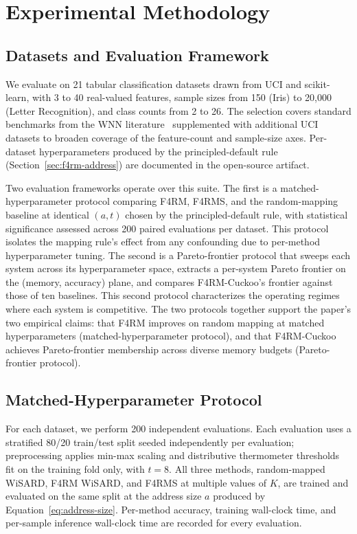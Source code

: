 

\section{Experimental Methodology}
\label{sec:methodology}
\label{sec:experiments}

\subsection{Datasets and Evaluation Framework}
\label{sec:method-data}

We evaluate on 21 tabular classification datasets drawn from UCI and scikit-learn, with 3 to 40 real-valued features, sample sizes from 150 (Iris) to 20{,}000 (Letter Recognition), and class counts from 2 to 26. The selection covers standard benchmarks from the WNN literature~\cite{susskind2022bthowen,susskind2023uleen} supplemented with additional UCI datasets to broaden coverage of the feature-count and sample-size axes. Per-dataset hyperparameters produced by the principled-default rule (Section~\ref{sec:f4rm-address}) are documented in the open-source artifact.

Two evaluation frameworks operate over this suite. The first is a matched-hyperparameter protocol comparing F4RM, F4RMS, and the random-mapping baseline at identical $(a, t)$ chosen by the principled-default rule, with statistical significance assessed across 200 paired evaluations per dataset. This protocol isolates the mapping rule's effect from any confounding due to per-method hyperparameter tuning. The second is a Pareto-frontier protocol that sweeps each system across its hyperparameter space, extracts a per-system Pareto frontier on the (memory, accuracy) plane, and compares F4RM-Cuckoo's frontier against those of ten baselines. This second protocol characterizes the operating regimes where each system is competitive. The two protocols together support the paper's two empirical claims: that F4RM improves on random mapping at matched hyperparameters (matched-hyperparameter protocol), and that F4RM-Cuckoo achieves Pareto-frontier membership across diverse memory budgets (Pareto-frontier protocol).

\subsection{Matched-Hyperparameter Protocol}
\label{sec:method-matched}

For each dataset, we perform 200 independent evaluations. Each evaluation uses a stratified 80/20 train/test split seeded independently per evaluation; preprocessing applies min-max scaling and distributive thermometer thresholds~\cite{lima2020distributive} fit on the training fold only, with $t = 8$. All three methods, random-mapped WiSARD, F4RM WiSARD, and F4RMS at multiple values of $K$, are trained and evaluated on the same split at the address size $a$ produced by Equation~\ref{eq:address-size}. Per-method accuracy, training wall-clock time, and per-sample inference wall-clock time are recorded for every evaluation.

